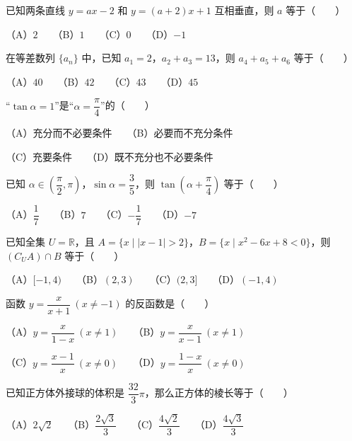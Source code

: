 \begin{question}
已知两条直线 $y=ax-2$ 和 $y=(a+2)x+1$ 互相垂直，则 $a$ 等于\mbox{（　　）}

（A）$2$　　（B）$1$　　（C）$0$　　（D）$-1$

\end{question}
\begin{question}
在等差数列 $\{a_n\}$ 中，已知 $a_1=2$，$a_2+a_3=13$，则 $a_4+a_5+a_6$ 等于\mbox{（　　）}

（A）$40$　　（B）$42$　　（C）$43$　　（D）$45$

\end{question}
\begin{question}
“$\tan\alpha=1$”是“$\alpha=\dfrac{\pi}{4}$”的\mbox{（　　）}

（A）充分而不必要条件　　（B）必要而不充分条件

（C）充要条件　　（D）既不充分也不必要条件

\end{question}
\begin{question}
已知 $\alpha\in\left(\dfrac{\pi}{2},\pi\right)$，$\sin\alpha=\dfrac35$，则 $\tan\left(\alpha+\dfrac{\pi}{4}\right)$ 等于\mbox{（　　）}

（A）$\dfrac17$　　（B）$7$　　（C）$-\dfrac17$　　（D）$-7$

\end{question}
\begin{question}
已知全集 $U=\mathbb R$，且 $A=\{x\mid |x-1|>2\}$，$B=\{x\mid x^2-6x+8<0\}$，则 $(C_U A)\cap B$ 等于\mbox{（　　）}

（A）$[-1,4)$　　（B）$(2,3)$　　（C）$(2,3]$　　（D）$(-1,4)$

\end{question}
\begin{question}
函数 $y=\dfrac{x}{x+1}\ (x\ne-1)$ 的反函数是\mbox{（　　）}

（A）$y=\dfrac{x}{1-x}\ (x\ne1)$　　（B）$y=\dfrac{x}{x-1}\ (x\ne1)$

（C）$y=\dfrac{x-1}{x}\ (x\ne0)$　　（D）$y=\dfrac{1-x}{x}\ (x\ne0)$

\end{question}
\begin{question}
已知正方体外接球的体积是 $\dfrac{32}{3}\pi$，那么正方体的棱长等于\mbox{（　　）}

（A）$2\sqrt2$　　（B）$\dfrac{2\sqrt3}{3}$　　（C）$\dfrac{4\sqrt2}{3}$　　（D）$\dfrac{4\sqrt3}{3}$

\end{question}

